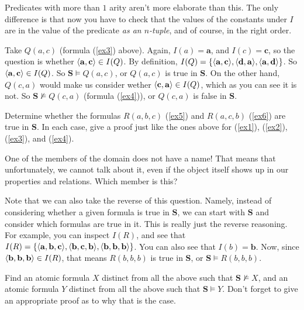 Predicates with more than $1$ arity aren't more elaborate than this. The only difference is that now you have to check that the values of the constants under $I$ are in the value of the predicate \textit{as an $n$-tuple}, and of course, in the right order. 

Take $Q(a, c)$ (formula (\ref{ex3}) above). Again, $I(a)=\mathbf{a}$, and $I(c)=\mathbf{c}$, so the question is whether $\langle\mathbf{a}, \mathbf{c}\rangle \in I(Q)$. By definition, $I(Q)=\{\langle\mathbf{a}, \mathbf{c}\rangle, \langle\mathbf{d}, \mathbf{a}\rangle, \langle\mathbf{a}, \mathbf{d}\rangle\}$. So $\langle\mathbf{a}, \mathbf{c}\rangle \in I(Q)$. So $\mathbf{S} \models Q(a, c)$, or $Q(a,c)$ is true in $\mathbf{S}$. On the other hand, $Q(c, a)$ would make us consider wether $\langle\mathbf{c}, \mathbf{a}\rangle \in I(Q)$, which as you can see it is not. So $\mathbf{S}\not\models Q(c, a)$ (formula (\ref{ex4})), or $Q(c, a)$ is false in $\mathbf{S}$.

\begin{exc}
Determine whether the formulas $R(a, b, c)$ (\ref{ex5}) and $R(a, c, b)$ (\ref{ex6}) are true in $\mathbf{S}$. In each case, give a proof just like the ones above for (\ref{ex1}), (\ref{ex2}), (\ref{ex3}), and (\ref{ex4}). \label{atomicvalue}
\end{exc} 

\begin{exc}
One of the members of the domain does not have a name! That means that unfortunately, we cannot talk about it, even if the object itself shows up in our properties and relations. Which member is this?
\end{exc}

Note that we can also take the reverse of this question. Namely, instead of considering whether a given formula is true in $\mathbf{S}$, we can start with $\mathbf{S}$ and consider which formulas are true in it. This is really just the reverse reasoning. For example, you can inspect $I(R)$, and see that $I(R)=\{\langle\mathbf{a}, \mathbf{b}, \mathbf{c}\rangle, \langle\mathbf{b}, \mathbf{c}, \mathbf{b}\rangle, \langle\mathbf{b}, \mathbf{b}, \mathbf{b}\rangle\}$. You can also see that $I(b)=\mathbf{b}$. Now, since $\langle\mathbf{b}, \mathbf{b}, \mathbf{b}\rangle \in I(R)$, that means $R(b, b, b)$ is true in $\mathbf{S}$, or $\mathbf{S} \models R(b, b, b)$. 

\begin{exc}
Find an atomic formula $X$ distinct from all the above such that $\mathbf{S} \not\models X$, and an atomic formula $Y$ distinct from all the above such that $\mathbf{S} \models Y$. Don't forget to give an appropriate proof as to why that is the case. 
\end{exc}

